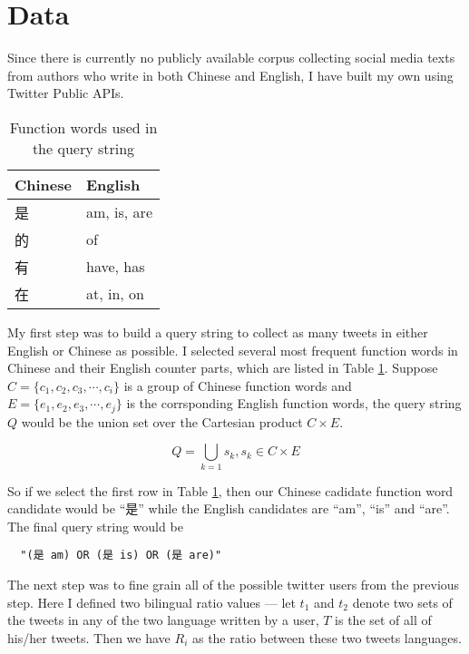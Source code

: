 \documentclass[11pt,a4paper]{article}
\begin{document}
\section{Data}\label{sec:data}

Since there is currently no publicly available corpus collecting social media texts from authors who write in both Chinese and English, I have built my own using Twitter Public APIs.

\begin{CJK*}{UTF8}{gbsn}

\begin{table}[t]
  \begin{center}
  \begin{tabular}{|l|l|}
  \hline \bf Chinese & \bf English \\ \hline
  是 & am, is, are \\
  的 & of \\
  有 & have, has \\
  在 & at, in, on \\
  \hline
  \end{tabular}
  \end{center}
  \caption{\label{tab:query-func-words-table} Function words used in the query string}
\end{table}

My first step was to build a query string to collect as many tweets in either English or Chinese as possible. I selected several most frequent function words in Chinese and their English counter parts, which are listed in Table \ref{tab:query-func-words-table}. Suppose $C=\{c_1, c_2, c_3, \cdots, c_i\}$ is a group of Chinese function words and $E=\{e_1, e_2, e_3, \cdots, e_j\}$ is the corrsponding English function words, the query string $Q$ would be the union set over the Cartesian product $C\times E$.

\begin{equation}
  Q=\bigcup_{k=1}s_k, s_k \in C \times E
\end{equation}

So if we select the first row in Table \ref{tab:query-func-words-table}, then our Chinese cadidate function word candidate would be ``是'' while the English candidates are ``am'', ``is'' and ``are''. The final query string would be \begin{verbatim}
  "(是 am) OR (是 is) OR (是 are)"
\end{verbatim}
\end{CJK*}

The next step was to fine grain all of the possible twitter users from the previous step. Here I defined two bilingual ratio values --- let $t_1$ and $t_2$ denote two sets of the tweets in any of the two language written by a user, $T$ is the set of all of his/her tweets. Then we have $R_i$ as the ratio between these two tweets languages.
\end{document}
